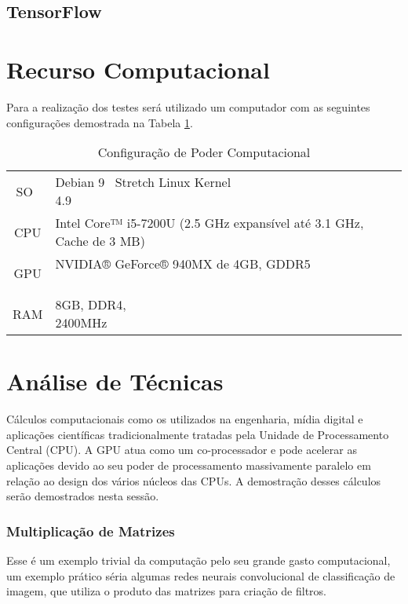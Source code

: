 \documentclass[conference]{IEEEtran}
\begin{document}
	\subsection{TensorFlow}
	
		
	\section{Recurso Computacional}
	Para a realiza\c{c}\~ao dos testes ser\'a utilizado um computador com as seguintes configura\c{c}\~oes demostrada na Tabela \ref{pc:pc1}.
	
	\begin{table}[H]
		\centering
		\caption{Configura\c{c}\~ao de Poder Computacional}
		\label{pc:pc1}
		\begin{tabular}{|c|l|}
			
			SO  & Debian 9  Stretch Linux Kernel 4.9                                                \\ 
			CPU &  Intel Core™ i5-7200U (2.5 GHz expansível até 3.1 GHz, Cache de 3 MB) \\ 
			GPU & NVIDIA® GeForce® 940MX de 4GB, GDDR5​                    \\ 
			RAM & 8GB, DDR4, 2400MHz                                       \\
			
		\end{tabular}
	\end{table}
	
	\section{An\'alise de T\'ecnicas}
	
	C\'alculos computacionais como os utilizados na engenharia, m\'idia digital e aplica\c{c}\~oes cient\'ificas tradicionalmente tratadas pela Unidade de Processamento Central (CPU). A GPU atua como um co-processador e pode acelerar as aplica\c{c}\~oes devido ao seu poder de processamento massivamente paralelo em rela\c{c}\~ao ao design dos v\'arios n\'ucleos das CPUs.
	A demostra\c{c}\~ao desses c\'alculos ser\~ao demostrados nesta sess\~ao.
	
	\subsubsection{Multiplica\c{c}\~ao de Matrizes}
	
	Esse \'e um exemplo trivial da computa\c{c}\~ao pelo seu grande gasto computacional, um exemplo pr\'atico s\'eria algumas redes neurais convolucional de classifica\c{c}\~ao de imagem, que utiliza o produto das matrizes para cria\c{c}\~ao de filtros.
	
\end{document}
